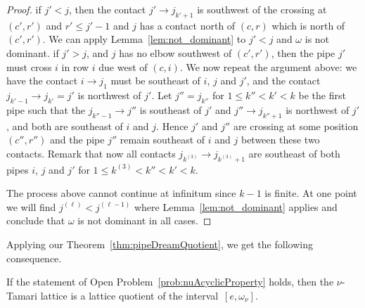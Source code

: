 \begin{proof}
if $j'<j$, then the contact $j'\to j_{k'+1}$ is southwest of the crossing at $(c',r')$ and  $r'\le j'-1$ and $j$ has a contact north of $(c,r)$ which is north of $(c',r')$. We can apply Lemma~\ref{lem:not_dominant} to 
 $j'<j$ and $\omega$ is not dominant. if $j'>j$, and $j$ has no elbow southwest of $(c',r')$, then the pipe $j'$ must cross $i$ in row $i$ due west of $(c,i)$.
We now repeat the argument above: we have the contact $i\to j_1$ must be southeast of $i$, $j$ and $j'$,
and the contact $j_{k'-1}\to j_{k'}=j'$ is northwest of $j'$.
Let  $j''=j_{k''}$ for $1\le k''<k' <k$ be the first pipe such that the $j_{k''-1}\to j''$ is southeast of $j'$ and $j''\to j_{k''+1}$ is northwest of $j'$, and both are southeast of $i$ and $j$. 
Hence $j'$ and $j''$ are crossing at some position $(c'',r'')$ and the pipe $j''$ remain southeast of $i$ and $j$ between these two contacts.
Remark that now all contacts $j_{k^{(3)}}\to j_{k^{(3)}+1}$ are southeast of both pipes  $i$, $j$ and $j'$ for $1\le k^{(3)}<k'' <k' < k$.

The process above cannot continue at infinitum since $k-1$ is finite. At one point we will find $j^{(\ell)}<j^{(\ell-1)}$ where Lemma~\ref{lem:not_dominant} applies and conclude that $\omega$ is not dominant
in all cases. 
\end{proof}

Applying our Theorem~\ref{thm:pipeDreamQuotient}, we get the following consequence.

\begin{corollary}
If the statement of Open Problem~\ref{prob:nuAcyclicProperty} holds, then the $\nu$-Tamari lattice is a lattice quotient of the interval~$[e,\omega_\nu]$.
\end{corollary}  
